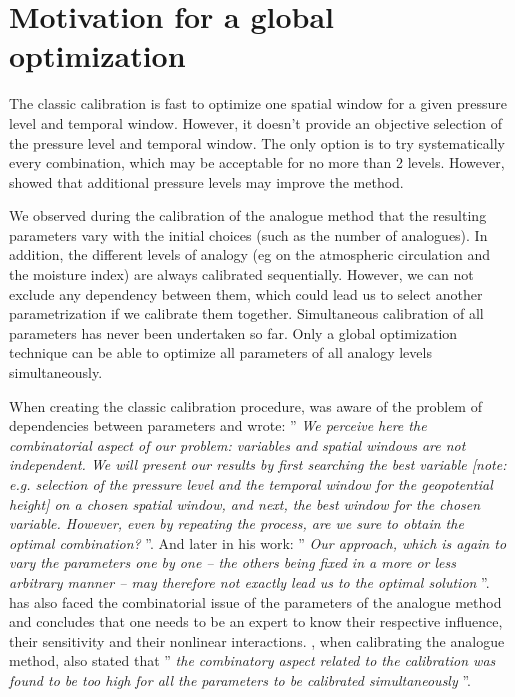 \documentclass[twocol]{ametsoc}
\begin{document}
\section{Motivation for a global optimization}

The classic calibration is fast to optimize one spatial window for a given pressure level and temporal window. However, it doesn't provide an objective selection of the pressure level and temporal window. The only option is to try systematically every combination, which may be acceptable for no more than 2 levels. However, \citet{Horton2012a} showed that additional pressure levels may improve the method.

We observed during the calibration of the analogue method that the resulting parameters vary with the initial choices (such as the number of analogues). In addition, the different levels of analogy (eg on the atmospheric circulation and the moisture index) are always calibrated sequentially. However, we can not exclude any dependency between them, which could lead us to select another parametrization if we calibrate them together. Simultaneous calibration of all parameters has never been undertaken so far. Only a global optimization technique can be able to optimize all parameters of all analogy levels simultaneously.

When creating the classic calibration procedure, \citet{Bontron2004} was aware of the problem of dependencies between parameters and wrote: '' \textit{We perceive here the combinatorial aspect of our problem: variables and spatial windows are not independent. We will present our results by first searching the best variable [note: e.g. selection of the pressure level and the temporal window for the geopotential height] on a chosen spatial window, and next, the best window for the chosen variable. However, even by repeating the process, are we sure to obtain the optimal combination?} ''. And later in his work: '' \textit{Our approach, which is again to vary the parameters one by one -- the others being fixed in a more or less arbitrary manner -- may therefore not exactly lead us to the optimal solution} ''. \citet{Bliefernicht2010} has also faced the combinatorial issue of the parameters of the analogue method and concludes that one needs to be an expert to know their respective influence, their sensitivity and their nonlinear interactions. \citet{BenDaoud2010}, when calibrating the analogue method, also stated that '' \textit{the combinatory aspect related to the calibration was found to be too high for all the parameters to be calibrated simultaneously } ''.
\end{document}
